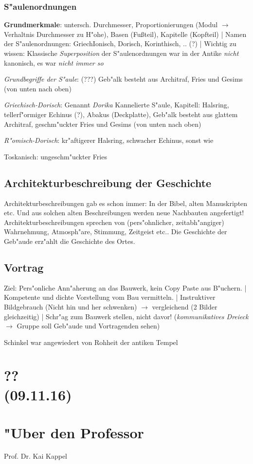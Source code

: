 \documentclass[]{scrartcl}
\begin{document}
\subsubsection{S"aulenordnungen}

\textbf{Grundmerkmale}: untersch. Durchmesser, Proportionierungen (Modul $\rightarrow$ Verhaltnis Durchmesser zu H"ohe), Basen (Fu\ss teil), Kapitelle (Kopfteil) | Namen der S"aulenordnungen: GriechIonisch, Dorisch, Korinthisch, .. {\color{red}(?)} | Wichtig zu wissen: Klassische \emph{Superposition} der S"aulenordnungen war in der Antike \emph{nicht} kanonisch, es war \emph{nicht immer so}

\emph{Grundbegriffe der S"aule}: {\color{red}(???)} Geb"alk besteht aus Architraf, Fries und Gesims (von unten nach oben)

\emph{Griechisch-Dorisch}: Genannt \emph{Dorika} Kannelierte S"aule, Kapitell: Halsring, tellerf"ormiger Echinus {\color{red}(?)}, Abakus (Deckplatte), Geb"alk besteht aus glattem Architraf, geschm"uckter Fries und Gesims (von unten nach oben) 

\emph{R"omisch-Dorisch}: kr"aftigerer Halsring, schwacher Echinus, sonst wie 

Toskanisch: ungeschm"uckter Fries

\subsection{Architekturbeschreibung der Geschichte}

Architekturbeschreibungen gab es schon immer: In der Bibel, alten Manuskripten etc. Und aus solchen alten Beschreibungen werden neue Nachbauten angefertigt!
Architekturbeschreibungen sprechen von (pers"ohnlicher, zeitabh"angiger) Wahrnehmung, Atmosph"are, Stimmung, Zeitgeist etc.. Die Geschichte der Geb"aude erz"ahlt die Geschichte des Ortes.



\subsection{Vortrag}

Ziel: Pers"onliche Ann"aherung an das Bauwerk, kein Copy Paste aus B"uchern. | 
Kompetente und dichte Vorstellung vom Bau vermitteln. | 
Instruktiver Bildgebrauch (Nicht hin und her schwenken) $\rightarrow$ vergleichend (2 Bilder gleichzeitig) |
Schr"ag zum Bauwerk stellen, nicht davor! (\emph{kommunikatives Dreieck} $\rightarrow$ Gruppe soll Geb"aude und Vortragenden sehen)

Schinkel war angewiedert von Rohheit der antiken Tempel

\section{??\\(09.11.16)}




\newpage
\section{"Uber den Professor}
Prof. Dr. Kai Kappel

\end{document}

